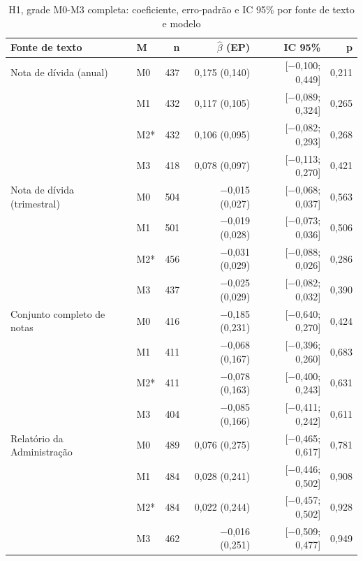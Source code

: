 \documentclass[a4paper,12pt]{report}
\begin{document}
\begin{table}[htbp]
    \centering
    \caption{H1, grade M0-M3 completa: coeficiente, erro-padrão e IC 95\% por fonte de texto e modelo}
    \label{tab:h1_m2_detalhe}
    \small
    \begin{tabular}{@{}llrrrr@{}}
        \toprule
        \textbf{Fonte de texto} & \textbf{M} & \textbf{n} & \textbf{$\hat\beta$ (EP)} & \textbf{IC 95\%} & \textbf{p} \\
        \midrule
        Nota de dívida (anual)      & M0 & 437 & 0,175 (0,140) & [$-$0,100; 0,449] & 0,211 \\
                                     & M1 & 432 & 0,117 (0,105) & [$-$0,089; 0,324] & 0,265 \\
                                     & M2* & 432 & 0,106 (0,095) & [$-$0,082; 0,293] & 0,268 \\
                                     & M3 & 418 & 0,078 (0,097) & [$-$0,113; 0,270] & 0,421 \\
        Nota de dívida (trimestral) & M0 & 504 & $-$0,015 (0,027) & [$-$0,068; 0,037] & 0,563 \\
                                     & M1 & 501 & $-$0,019 (0,028) & [$-$0,073; 0,036] & 0,506 \\
                                     & M2* & 456 & $-$0,031 (0,029) & [$-$0,088; 0,026] & 0,286 \\
                                     & M3 & 437 & $-$0,025 (0,029) & [$-$0,082; 0,032] & 0,390 \\
        Conjunto completo de notas  & M0 & 416 & $-$0,185 (0,231) & [$-$0,640; 0,270] & 0,424 \\
                                     & M1 & 411 & $-$0,068 (0,167) & [$-$0,396; 0,260] & 0,683 \\
                                     & M2* & 411 & $-$0,078 (0,163) & [$-$0,400; 0,243] & 0,631 \\
                                     & M3 & 404 & $-$0,085 (0,166) & [$-$0,411; 0,242] & 0,611 \\
        Relatório da Administração  & M0 & 489 & 0,076 (0,275) & [$-$0,465; 0,617] & 0,781 \\
                                     & M1 & 484 & 0,028 (0,241) & [$-$0,446; 0,502] & 0,908 \\
                                     & M2* & 484 & 0,022 (0,244) & [$-$0,457; 0,502] & 0,928 \\
                                     & M3 & 462 & $-$0,016 (0,251) & [$-$0,509; 0,477] & 0,949 \\

\end{tabular}
\end{table}
\end{document}
